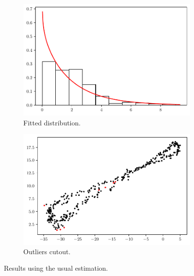 \documentclass[11pt]{article}
\theoremstyle{definition}
\theoremstyle{remark}
\theoremstyle{remark}
\begin{document}
\begin{figure}[H]
  \centering
  \begin{subfigure}[t]{0.475\textwidth}
    \centering
    \includegraphics[scale=0.45]{../figs/non_robust_hist_no-noise.pdf}
    \caption{Fitted distribution.}
  \end{subfigure}
  \begin{subfigure}[t]{0.475\textwidth}
    \centering
    \includegraphics[scale=0.45]{../figs/non_robust_scatter_no-noise.pdf}
    \caption{Outliers cutout.}
    \end{subfigure}
  \caption{Results using the usual estimation.}
  \label{fig:nrob_cut_nnoise}
\end{figure}
\end{document}
